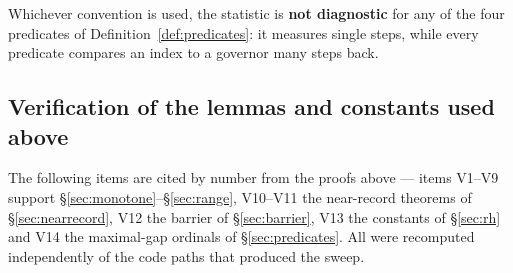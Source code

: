 \documentclass[11pt,a4paper]{article}
\theoremstyle{plain}
\theoremstyle{definition}
\theoremstyle{remark}
\begin{document}
Whichever convention is used, the statistic is \textbf{not diagnostic} for any of the four
predicates of Definition~\ref{def:predicates}: it measures single steps, while every predicate
compares an index to a governor many steps back.

\subsection{Verification of the lemmas and constants used above}
\label{sec:vitems}

The following items are cited by number from the proofs above --- items V1--V9 support
\S\ref{sec:monotone}--\S\ref{sec:range}, V10--V11 the near-record theorems of
\S\ref{sec:nearrecord}, V12 the barrier of \S\ref{sec:barrier}, V13 the constants of
\S\ref{sec:rh} and V14 the maximal-gap ordinals of \S\ref{sec:predicates}. All were recomputed
independently of the code paths that produced the sweep.
\end{document}
